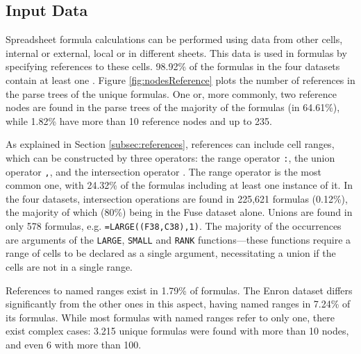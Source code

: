 \documentclass[times]{smrauth}
\begin{document}
 \noindent

\subsection{Input Data}
Spreadsheet formula calculations can be performed using data from other cells, internal or external, local or in different sheets. This data is used in formulas by specifying references to these cells. 98.92\% of the formulas in the four datasets contain at least one . Figure \ref{fig:nodesReference} plots the number of references in the parse trees of the unique formulas. One or, more commonly, two reference nodes are found in the parse trees of the majority of the formulas (in 64.61\%), while 1.82\% have more than 10 reference nodes and up to 235.

As explained in Section \ref{subsec:references}, references can include cell ranges, which can be constructed by three operators: the range operator \texttt{:}, the union operator \texttt{,}, and the intersection operator \texttt{}. The range operator is the most common one, with 24.32\% of the formulas including at least one instance of it. In the four datasets, intersection operations are found in 225,621 formulas (0.12\%), the majority of which (80\%) being in the Fuse dataset alone. Unions are found in only 578 formulas, e.g. \texttt{=LARGE((F38,C38),1)}. The majority of the occurrences are arguments of the \texttt{LARGE},  \texttt{SMALL} and \texttt{RANK} functions---these functions require a range of cells to be declared as a single argument, necessitating a union if the cells are not in a single range. 

References to named ranges exist in 1.79\% of formulas. The Enron dataset differs significantly from the other ones in this aspect, having named ranges in 7.24\% of its formulas. While most formulas with named ranges refer to only one, there exist complex cases: 3.215  unique formulas were found with more than 10  nodes, and even 6 with more than 100.
\end{document}
